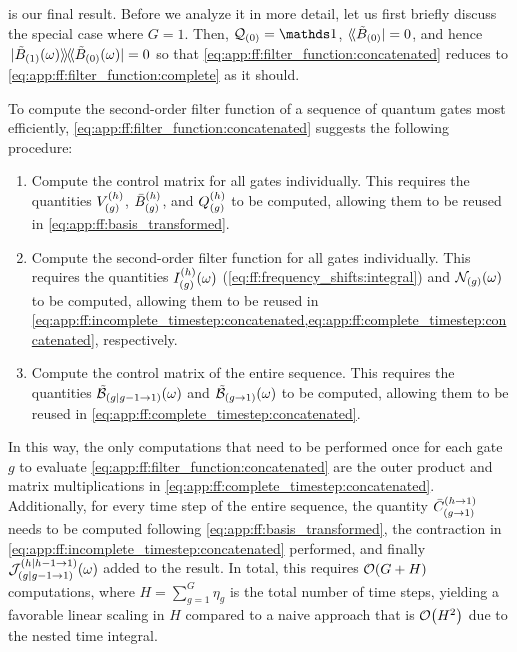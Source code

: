  is our final result.
Before we analyze it in more detail, let us first briefly discuss the special case where $G=1$.
Then, $\liouvQ_{(0)}=\eye$, $\dbra*{\Bt_{(0)}} = 0$, and hence $\dop*{\Bt_{(1)}(\omega)}{\Bt_{(0)}(\omega)} = 0$ so that \cref{eq:app:ff:filter_function:concatenated} reduces to \cref{eq:app:ff:filter_function:complete} as it should.

To compute the second-order filter function of a sequence of quantum gates most efficiently, \cref{eq:app:ff:filter_function:concatenated} suggests the following procedure:
\begin{enumerate}
    \item Compute the control matrix for all gates individually.
        This requires the quantities $V_{(g)}^{(h)}$, $\bar{B}_{(g)}^{(h)}$, and $Q_{(g)}^{(h)}$ to be computed, allowing them to be reused in \cref{eq:app:ff:basis_transformed}.
    \item Compute the second-order filter function for all gates individually.
        This requires the quantities $I_{(g)}^{(h)}(\omega)$ (\cref{eq:ff:frequency_shifts:integral}) and $\mathcal{N}_{(g)}(\omega)$ to be computed, allowing them to be reused in \cref{eq:app:ff:incomplete_timestep:concatenated,eq:app:ff:complete_timestep:concatenated}, respectively.
    \item Compute the control matrix of the entire sequence.
        This requires the quantities $\tilde{\mathcal{B}}_{(g|g-1\to 1)}(\omega)$ and $\tilde{\mathcal{B}}_{(g\to 1)}(\omega)$ to be computed, allowing them to be reused in \cref{eq:app:ff:complete_timestep:concatenated}.
\end{enumerate}
In this way, the only computations that need to be performed once for each gate $g$ to evaluate \cref{eq:app:ff:filter_function:concatenated} are the outer product and matrix multiplications in \cref{eq:app:ff:complete_timestep:concatenated}.
Additionally, for every time step of the entire sequence, the quantity $\bar{C}_{(g\to 1)}^{(h\to 1)}$ needs to be computed following \cref{eq:app:ff:basis_transformed}, the contraction in \cref{eq:app:ff:incomplete_timestep:concatenated} performed, and finally $\mathcal{J}_{(g|g-1\to 1)}^{(h|h-1\to 1)}(\omega)$ added to the result.
In total, this requires $\order{G + H}$ computations, where $H=\sum_{g=1}^{G}\eta_{g}$ is the total number of time steps, yielding a favorable linear scaling in $H$ compared to a naive approach that is $\order{H^2}$ due to the nested time integral.

